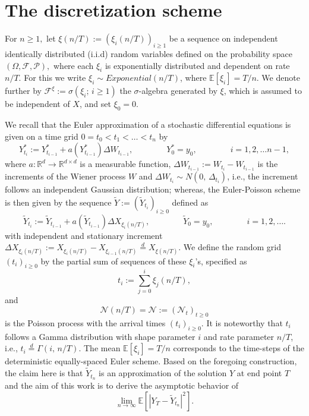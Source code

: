 \section{The discretization scheme}
For $n \geq 1 ,$ let $ \xi (n/T) := (\xi_{i} (n/T))_{i \geq 1}$  be a sequence on independent identically distributed (i.i.d) random variables defined on the probability space  $(\Omega, \mathcal{F}, \mathcal{P}),$ where each $\xi_i$ is exponentially distributed and dependent on rate $n/T$. For this we write \break  $\xi_{i} \sim Exponential(n/T)$, where $\mathbb{E}[ \xi_{i}]= T/n $. We denote further by $\mathcal{F}^{\xi} := \sigma( \xi_{i} ; \,  i \geq 1)$ the  $\sigma$-algebra generated by $ \xi $, which is assumed to be independent of $X$, and set  $\xi_{0} = 0$. %

We recall that the Euler approximation of a stochastic differential equations is given on a time grid $0 = t_0 < t_1 < \ldots < t_n$ by
\begin{equation*}
Y^*_{t_{i}} := Y^*_{t_{i-1}} + a(Y^*_{t_{i-1}})\Delta W_{t_{i-1}},  \qquad \qquad
  Y^*_0 = y_0, \qquad \qquad  i = 1, 2, \ldots n-1,
\end{equation*}
where $a : \mathbb{R}^d \to \mathbb{R}^{d \times d}$ is a measurable function, $\Delta W_{t_{i-1}} := W_{t_{i}}-W_{t_{i-1}}$ is the increments of the Wiener process $W$ and $\Delta W_{t_{i}} \sim N (0, \, \Delta_{t_{i}})$, i.e., the increment follows an independent Gaussian distribution; whereas, the Euler-Poisson scheme is then given by the sequence $\tilde{Y} := (\tilde{Y}_{t_i})_{i\geq 0}$ defined as 
\begin{equation}\label{eq5}
\tilde{Y}_{t_{i}} := \tilde{Y}_{t_{i-1}} + a(\tilde{Y}_{t_{i-1}})\Delta X_{\xi_{i}(n/T)},  \qquad \qquad
  \tilde{Y}_0 = y_0, \qquad \qquad  i = 1, 2, \ldots .
\end{equation}
with independent and stationary increment $\Delta X_{\xi_{i}(n/T)} :=  X_{\xi_{i}(n/T)} - X_{\xi_{i-1}(n/T)} \overset{d}{=}  X_{\xi (n/T)}$. We define the random grid $(t_{i})_{i \geq 0}$ by the partial sum of sequences of these $\xi_{i}$'s, specified as
\begin{equation}\label{t_i}
 t_{i} := \sum_{j=0}^{i}  \xi_{j}(n/T),
\end{equation}
and $$\mathcal{N}(n/T) = \mathcal{N} := (\mathcal{N}_{t})_{t \geq 0}$$ is the Poisson process with the arrival times $(t_{i})_{i \geq 0}$. It is noteworthy that $t_{i}$ follows a Gamma distribution with shape parameter $i$ and rate parameter $n/T$, i.e., $t_{i} \overset{d}{=} \Gamma(i, \, n/T)$. The mean $\mathbb{E}[\xi_{i}]= T/n$ corresponds to the time-steps of the deterministic equally-spaced Euler scheme. Based on the foregoing construction, the  claim here is that $\tilde{Y}_{t_n}$ is an approximation of the solution $Y$ at end point $T$ and the aim of this work is to derive the asymptotic behavior of 
\begin{equation}\label{eq6}
\lim_{n\to\infty} \mathbb{E}[|Y_T - \tilde{Y}_{t_n}|^2].
\end{equation}

